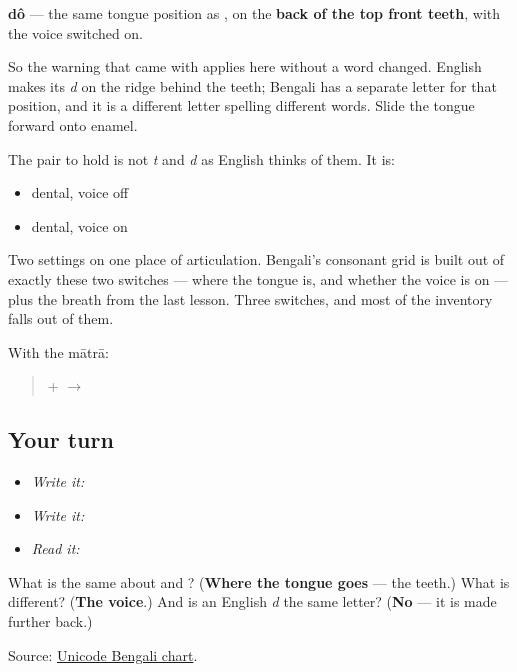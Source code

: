 \begin{quote}
\end{quote}

\textbf{dô} — the same tongue position as \textbf{}, on the \textbf{back of the top front teeth}, with the voice switched on.

So the warning that came with \textbf{} applies here without a word changed. English makes its \emph{d} on the ridge behind the teeth; Bengali has a separate letter for that position, and it is a different letter spelling different words. Slide the tongue forward onto enamel.

The pair to hold is not \emph{t} and \emph{d} as English thinks of them. It is:

\begin{itemize}
\raggedright
  \item \textbf{} dental, voice off
  \item \textbf{} dental, voice on
\end{itemize}

Two settings on one place of articulation. Bengali's consonant grid is built out of exactly these two switches — where the tongue is, and whether the voice is on — plus the breath from the last lesson. Three switches, and most of the inventory falls out of them.

With the mātrā:

\begin{quote}
\textbf{} + \textbf{} $\to$ \textbf{}
\end{quote}

\subsection*{Your turn}
\begin{itemize}
\raggedright
  \item \emph{Write it:} 
  \item \emph{Write it:}  
  \item \emph{Read it:}  
\end{itemize}

\begin{tcolorbox}[breakable,colback=teal!4,colframe=teal!35!black,title={Before you move on}]
What is the same about \textbf{} and \textbf{}? (\textbf{Where the tongue goes} — the teeth.) What is different? (\textbf{The voice}.) And is an English \emph{d} the same letter? (\textbf{No} — it is made further back.)

Source: \href{https://www.unicode.org/charts/PDF/U0980.pdf}{Unicode Bengali chart}.
\end{tcolorbox}
